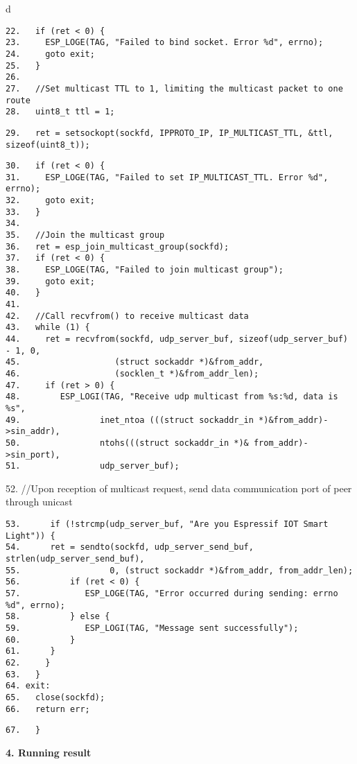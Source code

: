 \documentclass[a4paper,12pt]{book}
\begin{document}
\begin{codebloc}
\begin{tabular}{d}
\vspace{2pt}
\begin{verbatim}
22.   if (ret < 0) {
23.     ESP_LOGE(TAG, "Failed to bind socket. Error %d", errno);
24.     goto exit;
25.   }
26.	
27.   //Set multicast TTL to 1, limiting the multicast packet to one route
28.   uint8_t ttl = 1;
\end{verbatim}
\verb|29.   |\fontsize{9.5pt}{10pt}\selectfont\verb|ret = setsockopt(sockfd, IPPROTO_IP, IP_MULTICAST_TTL, &ttl, sizeof(uint8_t));|
\footnotesize
\begin{verbatim}
30.   if (ret < 0) {
31.     ESP_LOGE(TAG, "Failed to set IP_MULTICAST_TTL. Error %d", errno);
32.     goto exit;
33.   }
34.	
35.   //Join the multicast group
36.   ret = esp_join_multicast_group(sockfd);
37.   if (ret < 0) {
38.     ESP_LOGE(TAG, "Failed to join multicast group");
39.     goto exit;
40.   }
41.	
42.   //Call recvfrom() to receive multicast data
43.   while (1) {
44.     ret = recvfrom(sockfd, udp_server_buf, sizeof(udp_server_buf) - 1, 0,
45.                   (struct sockaddr *)&from_addr,
46.                   (socklen_t *)&from_addr_len);
47.     if (ret > 0) {
48.        ESP_LOGI(TAG, "Receive udp multicast from %s:%d, data is %s",
49.                inet_ntoa (((struct sockaddr_in *)&from_addr)->sin_addr),
50.                ntohs(((struct sockaddr_in *)& from_addr)->sin_port),
51.                udp_server_buf);
\end{verbatim}
52. \fontsize{8pt}{10pt}\selectfont//Upon reception of multicast request, send data communication port of peer through unicast
\footnotesize
\begin{verbatim}
53.      if (!strcmp(udp_server_buf, "Are you Espressif IOT Smart Light")) {
54.      ret = sendto(sockfd, udp_server_send_buf, strlen(udp_server_send_buf),
55.                  0, (struct sockaddr *)&from_addr, from_addr_len);
56.          if (ret < 0) {
57.             ESP_LOGE(TAG, "Error occurred during sending: errno %d", errno);
58.          } else {
59.             ESP_LOGI(TAG, "Message sent successfully");
60.          }
61.      }
62.     }
63.   }
64.	exit:
65.   close(sockfd);
66.   return err;
\end{verbatim}
\verb|67.	}|
\end{tabular}
\end{codebloc}

\textbf{4. Running result}
\end{document}
